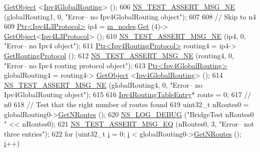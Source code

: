 \begin{DoxyCode}
      \hyperlink{classns3_1_1Object_a13e18c00017096c8381eb651d5bd0783}{GetObject} <\hyperlink{classns3_1_1Ipv4GlobalRouting}{Ipv4GlobalRouting}> ();
606   \hyperlink{group__testing_ga73d66fb0050a5111453fd144e767b91a}{NS\_TEST\_ASSERT\_MSG\_NE} (globalRouting1, 0, \textcolor{stringliteral}{"Error-- no Ipv4GlobalRouting object"});  
607 
608   \textcolor{comment}{// Skip to n4}
609   \hyperlink{classns3_1_1Ptr}{Ptr<Ipv4L3Protocol>} ip4 = \hyperlink{classBridgeTest_af539673ded293faf900a2202eeb0dbb0}{m\_nodes}.\hyperlink{classns3_1_1NodeContainer_a9ed96e2ecc22e0f5a3d4842eb9bf90bf}{Get} (4)->
      \hyperlink{classns3_1_1Object_a13e18c00017096c8381eb651d5bd0783}{GetObject}<\hyperlink{classns3_1_1Ipv4L3Protocol}{Ipv4L3Protocol}> ();
610   \hyperlink{group__testing_ga73d66fb0050a5111453fd144e767b91a}{NS\_TEST\_ASSERT\_MSG\_NE} (ip4, 0, \textcolor{stringliteral}{"Error-- no Ipv4 object"});  
611   \hyperlink{classns3_1_1Ptr}{Ptr<Ipv4RoutingProtocol>} routing4 = ip4->
      \hyperlink{classns3_1_1Ipv4L3Protocol_aa1e4efbf4978299e47406895c3f4b41d}{GetRoutingProtocol} ();
612   \hyperlink{group__testing_ga73d66fb0050a5111453fd144e767b91a}{NS\_TEST\_ASSERT\_MSG\_NE} (routing4, 0, \textcolor{stringliteral}{"Error-- no Ipv4 routing protocol object"});  
613   \hyperlink{classns3_1_1Ptr}{Ptr<Ipv4GlobalRouting>} globalRouting4 = routing4->
      \hyperlink{classns3_1_1Object_a13e18c00017096c8381eb651d5bd0783}{GetObject} <\hyperlink{classns3_1_1Ipv4GlobalRouting}{Ipv4GlobalRouting}> ();
614   \hyperlink{group__testing_ga73d66fb0050a5111453fd144e767b91a}{NS\_TEST\_ASSERT\_MSG\_NE} (globalRouting4, 0, \textcolor{stringliteral}{"Error-- no Ipv4GlobalRouting object"});  
615 
616   \hyperlink{classns3_1_1Ipv4RoutingTableEntry}{Ipv4RoutingTableEntry}* route = 0;
617   \textcolor{comment}{// n0}
618   \textcolor{comment}{// Test that the right number of routes found}
619   uint32\_t nRoutes0 = globalRouting0->\hyperlink{classns3_1_1Ipv4GlobalRouting_abb9d2b3642272b9bd2697a5699922fa7}{GetNRoutes} ();
620   \hyperlink{group__logging_ga413f1886406d49f59a6a0a89b77b4d0a}{NS\_LOG\_DEBUG} (\textcolor{stringliteral}{"BridgeTest nRoutes0 "} << nRoutes0);
621   \hyperlink{group__testing_ga2a9d78cffb3db8e867c35fff0b698cf5}{NS\_TEST\_ASSERT\_MSG\_EQ} (nRoutes0, 3, \textcolor{stringliteral}{"Error-- not three entries"});
622   \textcolor{keywordflow}{for} (uint32\_t \hyperlink{bernuolliDistribution_8m_a6f6ccfcf58b31cb6412107d9d5281426}{i} = 0; \hyperlink{bernuolliDistribution_8m_a6f6ccfcf58b31cb6412107d9d5281426}{i} < globalRouting0->\hyperlink{classns3_1_1Ipv4GlobalRouting_abb9d2b3642272b9bd2697a5699922fa7}{GetNRoutes} (); \hyperlink{bernuolliDistribution_8m_a6f6ccfcf58b31cb6412107d9d5281426}{i}++)

\end{DoxyCode}
